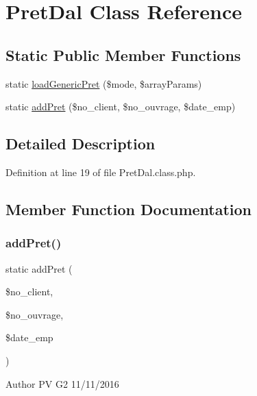 \hypertarget{class_pret_dal}{}\section{Pret\+Dal Class Reference}
\label{class_pret_dal}
\subsection*{Static Public Member Functions}
\begin{DoxyCompactItemize}
\item 
static \hyperlink{class_pret_dal_a64160420395c456d3b8156ea4c50debf}{load\+Generic\+Pret} (\$mode, \$array\+Params)
\item 
static \hyperlink{class_pret_dal_ade787cbf441d30de9f3838f7e8d6cb37}{add\+Pret} (\$no\+\_\+client, \$no\+\_\+ouvrage, \$date\+\_\+emp)
\end{DoxyCompactItemize}


\subsection{Detailed Description}


Definition at line 19 of file Pret\+Dal.\+class.\+php.



\subsection{Member Function Documentation}
\mbox{\label{class_pret_dal_ade787cbf441d30de9f3838f7e8d6cb37}} 
\subsubsection{\texorpdfstring{add\+Pret()}{addPret()}}
{\footnotesize\ttfamily static add\+Pret (\begin{DoxyParamCaption}\item[{}]{\$no\+\_\+client,  }\item[{}]{\$no\+\_\+ouvrage,  }\item[{}]{\$date\+\_\+emp }\end{DoxyParamCaption})\hspace{0.3cm}{\ttfamily [static]}}

\begin{DoxyAuthor}{Author}
PV G2 11/11/2016 
\end{DoxyAuthor}

